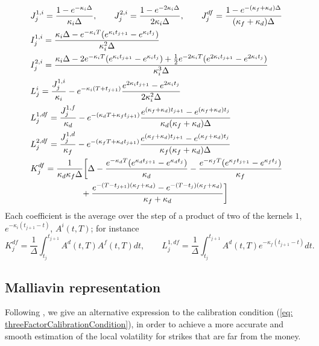 \begin{align*}
& J_j^{1,i} = \frac{1-e^{-\kappa_i\Delta }}{\kappa_i\Delta}, \qquad
 J_j^{2,i} = \frac{1-e^{-2\kappa_i\Delta } }{2\kappa_i\Delta}, \qquad
 J_j^{df} = \frac{1 - e^{-(\kappa_f +\kappa_d)\Delta}}{(\kappa_f +\kappa_d)\Delta} \bigskip\\
& I^{1,i}_j = \frac{\kappa_i\Delta-e^{-\kappa_i T }(e^{\kappa_i t_{j+1} }-e^{\kappa_i t_{j} }) }{\kappa_i^2 \Delta} \\
& I^{2,i}_j = \frac{\kappa_i\Delta  -2e^{-\kappa_i T }(e^{\kappa_i t_{j+1} }-e^{\kappa_i t_{j} }) +\frac{1}{2}e^{-2\kappa_i T }(e^{2\kappa_i t_{j+1} }-e^{2\kappa_i t_{j} }) }{\kappa_i^3\Delta}\\
& L_j^i = \frac{J_j^{1,i}}{\kappa_i}-e^{-\kappa_i(T + t_{j+1}) } \frac{ e^{2\kappa_i t_{j+1} }-e^{2\kappa_i t_{j} }  }{2\kappa_i^2\Delta} \\
& L^{1,df}_j = \frac{J_j^{1,f}}{\kappa_d}-e^{- (\kappa_d T + \kappa_f t_{j+1}) } \frac{ e^{(\kappa_f +\kappa_d) t_{j+1} }-e^{(\kappa_f +\kappa_d) t_{j} }  }{\kappa_d(\kappa_f +\kappa_d)\Delta}\\
& L^{2,df}_j = \frac{J_j^{1,d}}{\kappa_f}-e^{- (\kappa_f T + \kappa_d t_{j+1}) } \frac{ e^{(\kappa_f +\kappa_d) t_{j+1} }-e^{(\kappa_f +\kappa_d) t_{j} }  }{\kappa_f(\kappa_f +\kappa_d)\Delta}\\
& K^{df}_j = \frac{1}{\kappa_d\kappa_f\Delta}\bigg[\Delta - \frac{e^{-\kappa_d T}(e^{\kappa_d t_{j+1}} - e^{\kappa_d t_j} )}{\kappa_d} - \frac{e^{-\kappa_f T}(e^{\kappa_f t_{j+1}} - e^{\kappa_f t_j} )}{\kappa_f}\\
& \qquad\qquad\qquad + \frac{e^{-(T-t_{j+1})(\kappa_f +\kappa_d)} - e^{-(T-t_{j})(\kappa_f +\kappa_d)}}{\kappa_f +\kappa_d}\bigg]
\end{align*}
Each coefficient is the average over the step of a product of two of the kernels $1$, $e^{-\kappa_i(t_{j+1}-t)}$, $A^i(t,T)$; for instance
$$K^{df}_j=\frac{1}{\Delta}\int_{t_j}^{t_{j+1}}A^d(t,T)A^f(t,T)dt,\qquad L^{1,df}_j=\frac{1}{\Delta}\int_{t_j}^{t_{j+1}}A^d(t,T)e^{-\kappa_f(t_{j+1}-t)}dt.$$

\subsection{Malliavin representation}\label{subsec: malliavin3F}
Following \cite{guyonLabordere}, we give an alternative expression to the calibration condition (\ref{eq: threeFactorCalibrationCondition}), in order to achieve a more accurate and smooth estimation of the local volatility for strikes that are far from the money.

